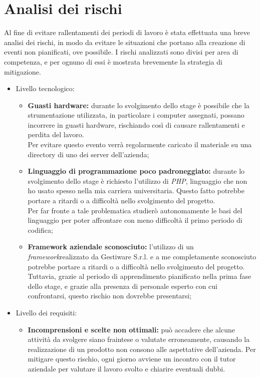 \section{Analisi dei rischi}
Al fine di evitare rallentamenti dei periodi di lavoro è stata effettuata una breve analisi dei rischi, in modo da evitare le situazioni che portano alla creazione di eventi non pianificati, ove possibile. I rischi analizzati sono divisi per area di competenza, e per ognuno di essi è mostrata brevemente la strategia di mitigazione.
\begin{itemize}
    \item Livello tecnologico: 
        \begin{itemize}
            \item \textbf{Guasti hardware:} durante lo svolgimento dello stage è possibile che la strumentazione utilizzata, in particolare i computer assegnati, possano incorrere in guasti hardware, rischiando così di causare rallentamenti e perdita del lavoro.
            \\
            Per evitare questo evento verrà regolarmente caricato il materiale su una directory di uno dei server dell'azienda;
            
            \item \textbf{Linguaggio di programmazione poco padroneggiato:} durante lo svolgimento dello stage è richiesto l'utilizzo di \emph{PHP}\glsfirstoccur, linguaggio che non ho usato spesso nella mia carriera universitaria. Questo fatto potrebbe portare a ritardi o a difficoltà nello svolgimento del progetto. 
            \\
            Per far fronte a tale problematica studierò autonomamente le basi del linguaggio per poter affrontare con meno difficoltà il primo periodo di codifica;
            
            \item \textbf{Framework aziendale sconosciuto:} l'utilizzo di un \emph{framework}\glsfirstoccur realizzato da Gestiware S.r.l. e a me completamente sconosciuto potrebbe portare a ritardi o a difficoltà nello svolgimento del progetto.
            \\
             Tuttavia, grazie al periodo di apprendimento pianificato nella prima fase dello stage, e grazie alla presenza di personale esperto con cui confrontarsi, questo rischio non dovrebbe presentarsi;
        \end{itemize}
    \item Livello dei requisiti:
        \begin{itemize}
            \item \textbf{Incomprensioni e scelte non ottimali:} può accadere che alcune attività da svolgere siano fraintese o valutate erroneamente, causando la realizzazione di un prodotto non consono alle aspettative dell'azienda. Per mitigare questo rischio, ogni giorno avviene un incontro con il tutor aziendale per valutare il lavoro svolto e chiarire eventuali dubbi.
        \end{itemize}
\end{itemize}



